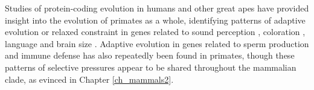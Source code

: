 

Studies of protein-coding evolution in humans and other great apes
have provided insight into the evolution of primates as a whole,
identifying patterns of adaptive evolution or relaxed constraint in
genes related to sound perception \citep{Clark2003}, coloration
\citep{Mundy2007}, language \citep{Enard2002} and brain size
\citep{Montgomery2011}. Adaptive evolution in genes related to sperm
production \citep{Clark2005} and immune defense \citep{Sawyer2005a}
has also repeatedly been found in primates, though these patterns of
selective pressures appear to be shared throughout the mammalian
clade, as evinced in Chapter \ref{ch_mammals2}.

